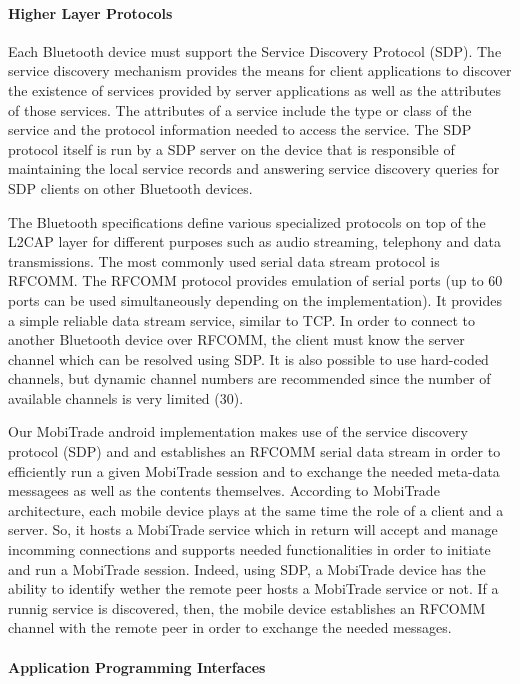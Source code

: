 \paragraph*{Higher Layer Protocols}

Each Bluetooth device must support the Service Discovery Protocol (SDP). The service discovery mechanism provides the means for client applications to discover the existence of services provided by server applications as well as the attributes of those services. The attributes of a service include the type or class of the service and the protocol information needed to access the service. The SDP protocol itself is run by a SDP server on the device that is responsible of maintaining the local service records and answering service discovery queries for SDP clients on other Bluetooth devices.

The Bluetooth specifications define various specialized protocols on top of the L2CAP layer for different purposes such as audio streaming, telephony and data transmissions. The most commonly used serial data stream protocol is RFCOMM. The RFCOMM protocol provides emulation of serial ports (up to 60 ports can be used simultaneously depending on the implementation). It provides a simple reliable data stream service, similar to TCP. In order to connect to another Bluetooth device over RFCOMM, the client must know the server channel which can be resolved using SDP. It is also possible to use hard-coded channels, but dynamic channel numbers are recommended since the number of available channels is very limited (30). 

Our MobiTrade android implementation makes use of the service discovery protocol (SDP) and and establishes an RFCOMM serial data stream in order to efficiently run a given MobiTrade session and to exchange the needed meta-data messagees as well as the contents themselves. According to MobiTrade architecture, each mobile device plays at the same time the role of a client and a server. So, it hosts a MobiTrade service which in return will accept and manage incomming connections and supports needed functionalities in order to initiate and run a MobiTrade session. Indeed,  using SDP, a MobiTrade device has the ability to identify wether the remote peer hosts a MobiTrade service or not. If a runnig service is discovered, then, the mobile device establishes an RFCOMM channel with the remote peer in order to exchange the needed messages.    

\paragraph*{Application Programming Interfaces}

